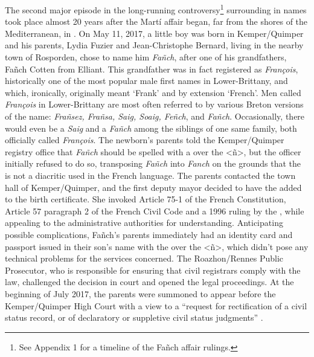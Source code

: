 \documentclass[output=paper,colorlinks,citecolor=brown]{langscibook}
\begin{document}
The second major episode in the long-running controversy\footnote{See Appendix 1 for a timeline of the Fañch affair rulings.} surrounding  in names took place almost 20 years after the Martí affair began, far from the shores of the Mediterranean, in . On May 11, 2017, a little boy was born in Kemper\slash Quimper and his parents, Lydia Fuzier and Jean-Christophe Bernard, living in the nearby town of Rosporden, chose to name him \textit{Fañch}, after one of his grandfathers, Fañch Cotten from Elliant. This grandfather was in fact registered as \textit{François}, historically one of the most popular male first names in Lower\hyp Brittany, and which, ironically, originally meant `Frank' and by extension `French'. Men called \textit{François} in Lower\hyp Brittany are most often referred to by various Breton versions of the name: \textit{Frañsez, Frañsa, Saig, Soaig, Feñch}, and \textit{Fañch}. Occasionally, there would even be a \textit{Saig} and a \textit{Fañch} among the siblings of one same family, both officially called \textit{François}. The newborn's parents told the Kemper/Quimper registry office that \textit{Fañch} should be spelled with a  over the <ñ>, but the officer initially refused to do so, transposing \textit{Fañch} into \textit{Fanch} on the grounds that the  is not a diacritic used in the French language. The parents contacted the town hall of Kemper\slash Quimper, and the first deputy mayor decided to have the  added to the birth certificate. She invoked Article 75-1 of the French Constitution, Article 57 paragraph 2 of the French Civil Code and a 1996 ruling by the , while appealing to the administrative authorities for understanding. Anticipating possible complications, Fañch's parents immediately had an identity card and passport issued in their son's name with the  over the <ñ>, which didn’t pose any technical problems for the services concerned. The Roazhon\slash Rennes Public Prosecutor, who is responsible for ensuring that civil registrars comply with the law, challenged the decision in court and opened the legal proceedings. At the beginning of July 2017, the parents were summoned to appear before the Kemper\slash Quimper High Court with a view to a “request for rectification of a civil status record, or of declaratory or suppletive civil status judgments” \citep{sm:Feltin-Palas2017}.
\end{document}
